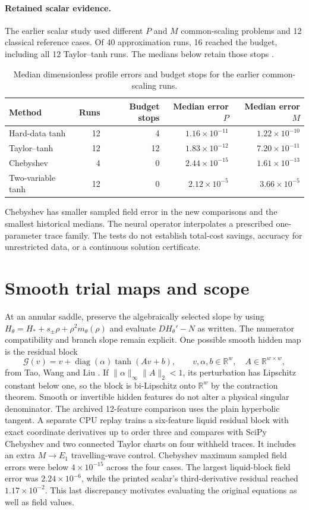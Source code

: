 \documentclass[12pt,a4paper,oneside]{report}
\numberwithin{equation}{chapter}
\theoremstyle{remark}\newtheorem{remark}[theorem]{Remark}
\begin{document}
\paragraph{Retained scalar evidence.}
The earlier scalar study used different $P$ and $M$ common-scaling problems and 12 classical reference cases. Of 40 approximation runs, 16 reached the budget, including all 12 Taylor--tanh runs. The medians below retain those stops \cite{scalarartifact}.
\begin{table}[htb]\centering\small
\begin{tabular}{@{}lrrrr@{}}\toprule
Method & Runs & Budget stops & Median error $P$ & Median error $M$\\\midrule
Hard-data tanh & 12 & 4 & $1.16\times10^{-11}$ & $1.22\times10^{-10}$\\
Taylor--tanh & 12 & 12 & $1.83\times10^{-12}$ & $7.20\times10^{-11}$\\
Chebyshev & 4 & 0 & $2.44\times10^{-15}$ & $1.61\times10^{-13}$\\
Two-variable tanh & 12 & 0 & $2.12\times10^{-5}$ & $3.66\times10^{-5}$\\
\bottomrule\end{tabular}
\caption[Historical scalar approximation results]{Median dimensionless profile errors and budget stops for the earlier common-scaling runs.}
\label{tab:historical}
\end{table}
Chebyshev has smaller sampled field error in the new comparisons and the smallest historical medians. The neural operator interpolates a prescribed one-parameter trace family. The tests do not establish total-cost savings, accuracy for unrestricted data, or a continuous solution certificate.

\section{Smooth trial maps and scope}
At an annular saddle, preserve the algebraically selected slope by using
$H_\theta=H_*+s_\pm\rho+\rho^2 m_\theta(\rho)$ and evaluate $DH_\theta'-N$ as written. The numerator compatibility and branch slope remain explicit. One possible smooth hidden map is the residual block
\[
 \mathcal G(v)=v+\operatorname{diag}(\alpha)\tanh(Av+b),
 \qquad v,\alpha,b\in\mathbb R^w,\quad A\in\mathbb R^{w\times w},
\]
from Tao, Wang and Liu \cite{tao2026}. If $\|\alpha\|_\infty\|A\|_2<1$, its perturbation has Lipschitz constant below one, so the block is bi-Lipschitz onto $\mathbb R^w$ by the contraction theorem. Smooth or invertible hidden features do not alter a physical singular denominator. The archived 12-feature comparison uses the plain hyperbolic tangent. A separate CPU replay trains a six-feature liquid residual block with exact coordinate derivatives up to order three and compares with SciPy Chebyshev and two connected Taylor charts on four withheld traces. It includes an extra $M\to E_1$ travelling-wave control. Chebyshev maximum sampled field errors were below $4\times10^{-15}$ across the four cases. The largest liquid-block field error was $2.24\times10^{-6}$, while the printed scalar's third-derivative residual reached $1.17\times10^{-2}$. This last discrepancy motivates evaluating the original equations as well as field values.
\end{document}
